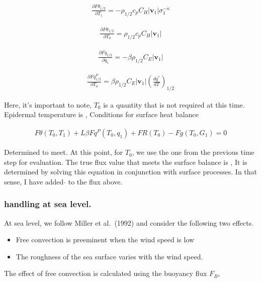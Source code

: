 \begin{eqnarray}
\frac{\partial F\theta_{1/2}}{\partial T_1} 
= - \rho_{1/2} c_p C_H |\mathbf{v}_1| \sigma_1^{-\kappa}
\end{eqnarray}

\begin{eqnarray}
\frac{\partial F\theta_{1/2}}{\partial T_0} 
= \rho_{1/2} c_p C_H |\mathbf{v}_1|
\end{eqnarray}

\begin{eqnarray}
\frac{\partial Fq_{1/2}}{\partial q_1} 
 =  - \beta \rho_{1/2} C_E |\mathbf{v}_1| 
\end{eqnarray}

\begin{eqnarray}
\frac{\partial Fq^P_{1/2}}{\partial T_0} 
 =  \beta \rho_{1/2} C_E |\mathbf{v}_1| \left( \frac{dq^*}{dT} \right)_{1/2}
\end{eqnarray}

Here, it's important to note, \(T_0\) is a quantity that is not required
at this time. Epidermal temperature is , Conditions for surface heat
balance

\begin{eqnarray}
   F\theta(T_0,T_1) + L \beta Fq^P(T_0,q_1) + FR(T_0) - Fg(T_0,G_1) = 0
\end{eqnarray}

Determined to meet. At this point, for \(T_0\), we use the one from the
previous time step for evaluation. The true flux value that meets the
surface balance is , It is determined by solving this equation in
conjunction with surface processes. In that sense, I have added
\(\hat{{}}\) to the flux above.

\hypertarget{handling-at-sea-level.}{%
\subsubsection{handling at sea level.}\label{handling-at-sea-level.}}

At sea level, we follow Miller et al.~(1992) and consider the following
two effects.

\begin{itemize}
\item
  Free convection is preeminent when the wind speed is low
\item
  The roughness of the sea surface varies with the wind speed.
\end{itemize}

The effect of free convection is calculated using the buoyancy flux
\(F_B\),

